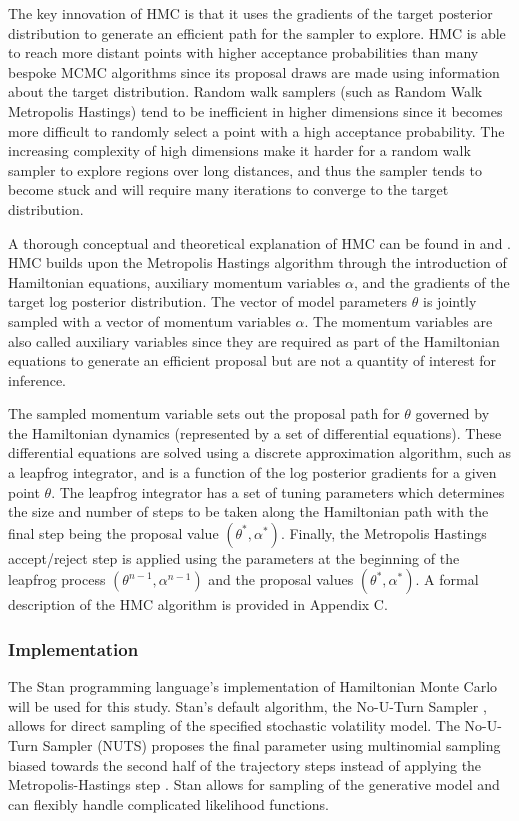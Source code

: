 \documentclass[12pt, a4paper]{article}
\begin{document}
        The key innovation of HMC is that it uses the gradients of the target posterior distribution to generate an efficient path for the sampler to explore. HMC is able to reach more distant points with higher acceptance probabilities than many bespoke MCMC algorithms since its  proposal draws are made using information about the target distribution. Random walk samplers (such as Random Walk Metropolis Hastings) tend to be inefficient in higher dimensions since it becomes more difficult to randomly select a point with a high acceptance probability. The increasing complexity of high dimensions make it harder for a random walk sampler to explore regions over long distances, and thus the sampler tends to become stuck and will require many iterations to converge to the target distribution. 

        A thorough conceptual and theoretical explanation of HMC can be found in \citet{gelman2013bayesian} and \citet{betancourt2017conceptual}. HMC builds upon the Metropolis Hastings algorithm through the introduction of Hamiltonian equations, auxiliary momentum variables $\alpha$, and the gradients of the target log posterior distribution. The vector of model parameters $\theta$ is jointly sampled with a vector of momentum variables $\alpha$. The momentum variables are also called auxiliary variables since they are required as part of the Hamiltonian equations to generate an efficient proposal but are not a quantity of interest for inference.

        The sampled momentum variable sets out the proposal path for $\theta$ governed by the Hamiltonian dynamics (represented by a set of differential equations). These differential equations are solved using a discrete approximation algorithm, such as a leapfrog integrator, and is a function of the log posterior gradients for a given point $\theta$. The leapfrog integrator has a set of tuning parameters which determines the size and number of steps to be taken along the Hamiltonian path with the final step being the proposal value $(\theta^{\ast}, \alpha^{\ast})$. Finally, the Metropolis Hastings accept/reject step is applied using the parameters at the beginning of the leapfrog process $(\theta^{n-1}, \alpha^{n-1})$ and the proposal values $(\theta^{\ast}, \alpha^{\ast})$. A formal description of the HMC algorithm is provided in Appendix C.

        \subsubsection{Implementation}
        The Stan programming language's implementation of Hamiltonian Monte Carlo will be used for this study. Stan's default algorithm, the No-U-Turn Sampler \citep{hoffman2014no}, allows for direct sampling of the specified stochastic volatility model. The No-U-Turn Sampler (NUTS) proposes the final parameter using multinomial sampling biased towards the second half of the trajectory steps instead of applying the Metropolis-Hastings step \citep{betancourt2016identifying}. Stan allows for sampling of the generative model and can flexibly handle complicated likelihood functions. 
        
\end{document}
